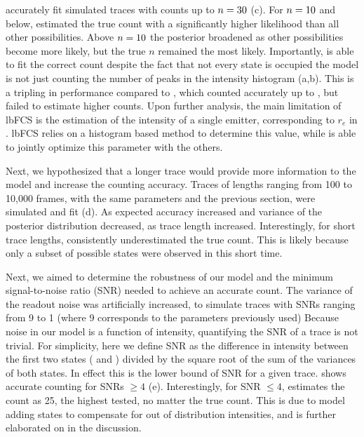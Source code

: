 \ours accurately fit simulated traces with counts up to $n=30$ (c).
	For $n=10$ and below, \ours estimated the true count with a significantly 
	higher likelihood than all other possibilities. 
	Above $n=10$ the posterior broadened as other possibilities become more likely, 
	but the true $n$ remained the most likely.
	Importantly, \ours is able to fit the correct count despite the fact that 
	not every state is occupied \ie the model is not just counting the 
	number of peaks in the intensity histogram (a,b).
	This is a tripling in performance compared to \lbfcs, which counted 
	accurately up to , but failed to estimate higher counts.
	Upon further analysis, the main limitation of lbFCS is the estimation of the 
	intensity of a single emitter, corresponding to $r_e$ in \ours. 
	lbFCS relies on a histogram based method to determine this value, while 
	\ours is able to jointly optimize this parameter with the others.

Next, we hypothesized that a longer trace would provide more 
information to the model and increase the counting accuracy.
	Traces of lengths ranging from 100 to 10,000 frames, with the same parameters 
	and the previous section, were simulated and fit (d).
	As expected accuracy increased and variance of the posterior distribution decreased, 
	as trace length increased.
	Interestingly, for short trace lengths, \ours consistently underestimated the true count. 
	This is likely because only a subset of possible states were observed in this short time. %

Next, we aimed to determine the robustness of our model and the minimum signal-to-noise ratio 
(SNR) needed to achieve an accurate count.
	The variance of the readout noise \camvar was artificially increased, 
	to simulate traces with SNRs ranging from 9 to 1 (where 9 
	corresponds to the parameters previously used)
	Because noise in our model is a function of intensity, quantifying the SNR of a trace 
	is not trivial. 
	For simplicity, here we define SNR as the difference in intensity between 
	the first two states ( and ) divided by the square root of the sum of the variances of both states. 
	In effect this is the lower bound of SNR for a given trace. 
	\ours shows accurate counting for SNRs $\geq 4$ (e). 
	Interestingly, for  SNR $\leq 4$, \ours estimates the count as 25, 
	the highest \n tested, no matter the true count. 
	This is due to model adding states to compensate for out of distribution intensities, 
	and is further elaborated on in the discussion. 


